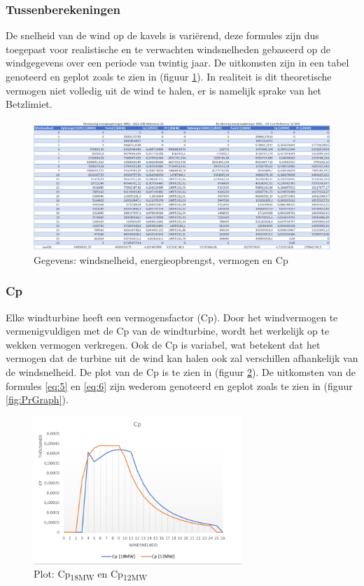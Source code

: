 \subsubsection{Tussenberekeningen}
De snelheid van de wind op de kavels is variërend, deze formules zijn dus toegepast voor realistische en te verwachten windsnelheden gebaseerd op de windgegevens over een periode van twintig jaar.\cite{WindData}
De uitkomsten zijn in een tabel genoteerd en geplot zoals te zien in (figuur \ref{fig:TVUW}). In realiteit is dit theoretische vermogen niet volledig uit de wind te halen, er is namelijk sprake van het Betzlimiet.

\begin{figure}[H]
\centering
\includegraphics[width=1\textwidth]{IMG/data/overzicht/TVUW.PNG}
\caption{Gegevens: windsnelheid, energieopbrengst, vermogen en Cp}
\label{fig:TVUW}
\end{figure}

\subsubsection{Cp}
Elke windturbine heeft een vermogensfactor (Cp). Door het windvermogen te vermenigvuldigen met de Cp van de windturbine, wordt het werkelijk op te wekken vermogen verkregen. Ook de Cp is variabel, wat betekent dat het vermogen dat de turbine uit de wind kan halen ook zal verschillen afhankelijk van de windsnelheid. De plot van de Cp is te zien in (figuur \ref{fig:CpGraph}). De uitkomsten van de formules \ref{eq:5} en \ref{eq:6} zijn wederom genoteerd en geplot zoals te zien in (figuur \ref{fig:PrGraph}). 
\begin{figure}[H]
\centering
\includegraphics[width=0.7\textwidth]{IMG/data/overzicht/Cp_graph.PNG}
\caption{Plot: Cp\textsubscript{18MW} en Cp\textsubscript{12MW}}
\label{fig:CpGraph}
\end{figure}
